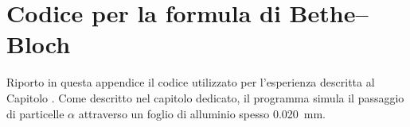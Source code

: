 \chapter{Codice per la formula di Bethe--Bloch}\label{app:bet}
    Riporto in questa appendice il codice utilizzato per l'esperienza descritta al Capitolo . Come descritto nel capitolo dedicato, il programma simula il passaggio di particelle $\alpha$ attraverso un foglio di alluminio spesso \SI{0.020}{\milli\meter}.
    